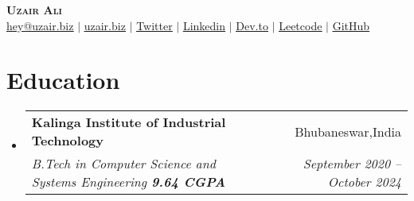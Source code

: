\documentclass[letterpaper,11pt]{article}
\makeatletter
\newcommand{\resumeItem}[1]{
  \item\small{
    {#1 \vspace{-2pt}}
  }
}
\newcommand{\resumeSubheading}[4]{
  \vspace{-2pt}\item
    \begin{tabular*}{0.97\textwidth}[t]{l@{\extracolsep{\fill}}r}
      \textbf{#1} & #2 \\
      \textit{\small#3} & \textit{\small #4} \\
    \end{tabular*}\vspace{-7pt}
}
\newcommand{\resumeSubHeadingListStart}{\begin{itemize}[leftmargin=0.15in, label={}]}
\newcommand{\resumeSubHeadingListEnd}{\end{itemize}}
\makeatother
\begin{document}

\begin{center}
    \textbf{\Huge \scshape Uzair Ali} \\ \vspace{1pt}
    \href{mailto:hey@uzair.biz}{\underline{hey@uzair.biz}} $|$ 
    \href{https://uzair.biz/}{\underline{uzair.biz}} $|$ 
    \href{https://twitter.com/UzairAli101}{\underline{Twitter}} $|$ 
    \href{https://linkedin.com/in/uzair-ali10}{\underline{Linkedin}} $|$
    \href{https://dev.to/uzairali10/}{\underline{Dev.to}} $|$
    \href{https://leetcode.com/uzair-ali10/}{\underline{Leetcode}} $|$
    \href{https://github.com/uzair-ali10}{\underline{GitHub}} 
    
    
\end{center}

\section{Education}
  \resumeSubHeadingListStart
    \resumeSubheading
      {Kalinga Institute of Industrial Technology}{Bhubaneswar,India}
      {B.Tech in Computer Science and Systems Engineering \textbf{9.64 CGPA}}{September 2020 -- October 2024}
  \resumeSubHeadingListEnd


\end{document}
